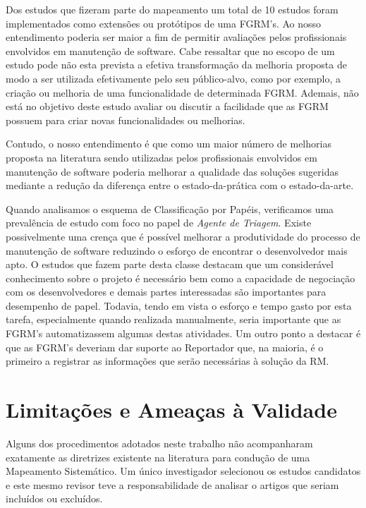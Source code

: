 Dos estudos que fizeram parte do mapeamento um total de 10 estudos foram
implementados como extensões ou protótipos de uma FGRM's. Ao nosso entendimento
poderia ser maior a fim de permitir avaliações pelos profissionais envolvidos em
manutenção de software. Cabe ressaltar que no escopo de um estudo pode não esta
prevista a efetiva transformação da melhoria proposta de modo a ser utilizada
efetivamente pelo seu público-alvo, como por exemplo, a criação ou melhoria de
uma funcionalidade de determinada FGRM\@. Ademais, não está no objetivo deste
estudo avaliar ou discutir a facilidade que as FGRM possuem para criar novas
funcionalidades ou melhorias.

Contudo, o nosso entendimento é que como um maior número de melhorias proposta
na literatura sendo utilizadas pelos profissionais envolvidos em manutenção de
software poderia melhorar a qualidade das soluções sugeridas mediante a redução
da diferença entre o estado-da-prática com o estado-da-arte.

Quando analisamos o esquema de Classificação por Papéis, verificamos uma
prevalência de estudo com foco no papel de \textit{Agente de Triagem}. Existe
possivelmente uma crença que é possível melhorar a produtividade do processo de
manutenção de software reduzindo o esforço de encontrar o desenvolvedor mais
apto. O estudos que fazem parte desta classe destacam que um considerável
conhecimento sobre o projeto é necessário bem como a capacidade de negociação
com os desenvolvedores e demais partes interessadas são importantes para
desempenho de papel. Todavia, tendo em vista o esforço e tempo gasto por esta
tarefa, especialmente quando realizada manualmente, seria importante que as
FGRM's automatizassem algumas destas atividades. Um outro ponto a destacar é que
as FGRM's deveriam dar suporte ao Reportador que, na maioria, é o primeiro a
registrar as informações que serão necessárias à solução da RM\@.

\section{Limitações e Ameaças à Validade}
\label{sec:map_limitacoes_ameacas}

Alguns dos procedimentos adotados neste trabalho não acompanharam exatamente as
diretrizes existente na literatura para condução de uma Mapeamento Sistemático.
Um único investigador selecionou os estudos candidatos e este mesmo revisor teve
a responsabilidade de analisar o artigos que seriam incluídos ou excluídos.

